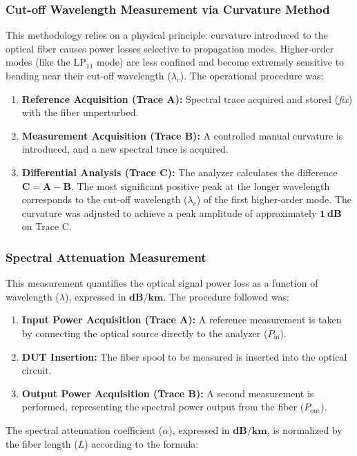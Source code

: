\documentclass[a4paper,11pt]{article}
\theoremstyle{mythmstyle}
\begin{document}
\subsubsection{Cut-off Wavelength Measurement via Curvature Method}
This methodology relies on a physical principle: curvature introduced to the optical fiber causes power losses selective to propagation modes. Higher-order modes (like the $\text{LP}_{11}$ mode) are less confined and become extremely sensitive to bending near their cut-off wavelength ($\lambda_c$).
The operational procedure was:
\begin{enumerate}
    \item \textbf{Reference Acquisition (Trace A):} Spectral trace acquired and stored (\textit{fix}) with the fiber unperturbed.
    \item \textbf{Measurement Acquisition (Trace B):} A controlled manual curvature is introduced, and a new spectral trace is acquired.
    \item \textbf{Differential Analysis (Trace C):} The analyzer calculates the difference $\mathbf{C = A - B}$. The most significant positive peak at the longer wavelength corresponds to the cut-off wavelength ($\lambda_c$) of the first higher-order mode. The curvature was adjusted to achieve a peak amplitude of approximately $\mathbf{1\ \text{dB}}$ on Trace C.
\end{enumerate}

\subsubsection{Spectral Attenuation Measurement}
This measurement quantifies the optical signal power loss as a function of wavelength ($\lambda$), expressed in $\mathbf{\text{dB/km}}$.
The procedure followed was:
\begin{enumerate}
    \item \textbf{Input Power Acquisition (Trace A):} A reference measurement is taken by connecting the optical source directly to the analyzer ($P_{\text{in}}$).
    \item \textbf{DUT Insertion:} The fiber spool to be measured is inserted into the optical circuit.
    \item \textbf{Output Power Acquisition (Trace B):} A second measurement is performed, representing the spectral power output from the fiber ($P_{\text{out}}$).
\end{enumerate}

The spectral attenuation coefficient ($\alpha$), expressed in $\mathbf{\text{dB/km}}$, is normalized by the fiber length ($L$) according to the formula:
\end{document}
